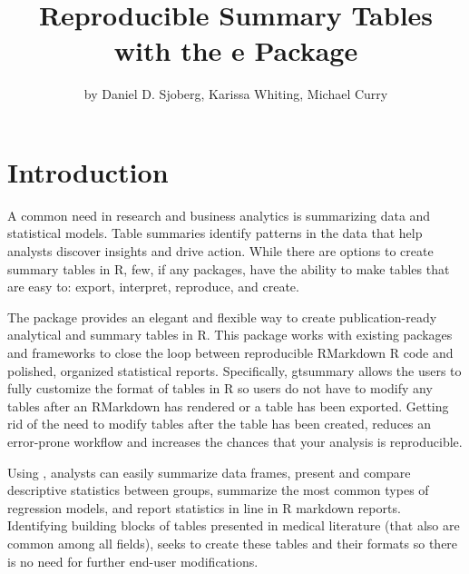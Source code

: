 \title{Reproducible Summary Tables with the e  Package}
\author{by Daniel D. Sjoberg, Karissa Whiting, Michael Curry}

\maketitle


\section{Introduction}
A common need in research and business analytics is summarizing data and statistical models.
Table summaries identify patterns in the data that help analysts discover insights and drive action.
While there are options to create summary tables in R, few, if any packages, have the ability to make tables that are easy to: export, interpret, reproduce, and create. 

The  \citep{gtsummary} package provides an elegant and flexible way to create publication-ready analytical and summary tables in R.
This package works with existing packages and frameworks to close the loop between reproducible RMarkdown R code and polished, organized statistical reports.
Specifically, gtsummary allows the users to fully customize the format of tables in R so users do not have to modify any tables after an RMarkdown has rendered or a table has been exported.
Getting rid of the need to modify tables after the table has been created, reduces an error-prone workflow and increases the chances that your analysis is reproducible. 

Using , analysts can easily summarize data frames, present and compare descriptive statistics between groups, summarize the most common types of regression models, and report statistics in line in R markdown reports. 
Identifying building blocks of tables presented in medical literature (that also are common among all fields),  seeks to create these tables and their formats so there is no need for further end-user modifications.  

